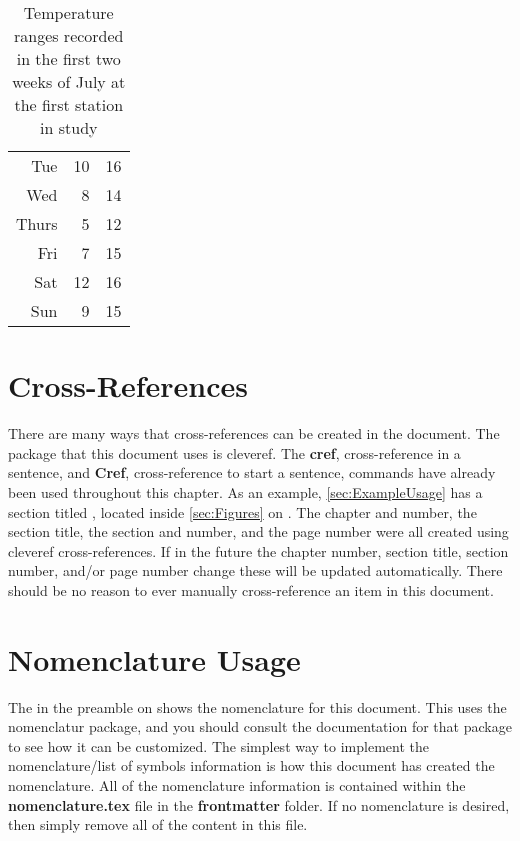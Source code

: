 \begin{table}
\begin{subtable}[h]{0.325\textwidth}
\begin{tabular}{r r r}
                Tue   & 10 & 16 \\
                Wed   & 8  & 14 \\
                Thurs & 5  & 12 \\
                Fri   & 7  & 15 \\
                Sat   & 12 & 16 \\
                Sun   & 9  & 15 \\
                \hline
            \end{tabular}
        \end{subtable}
        \caption{Temperature ranges recorded in the first two weeks of July at the first station in study}
        \label{tab:temps}
    \end{table}

\section{Cross-References} \label{sec:CrossReferences}
    There are many ways that cross-references can be created in the document.
    The package that this document uses is cleveref.
    The \textbf{cref}, cross-reference in a sentence, and \textbf{Cref}, cross-reference to start a sentence, commands have already been used throughout this chapter.
    As an example, \cref{sec:ExampleUsage} has a section titled \emph{}, located inside \cref{sec:Figures} on .
    The chapter and number, the section title, the section and number, and the page number were all created using cleveref cross-references.
    If in the future the chapter number, section title, section number, and/or page number change these will be updated automatically.
    There should be no reason to ever manually cross-reference an item in this document.

\section{Nomenclature Usage} \label{sec:NomenclatureUsage}
    The  in the preamble on  shows the nomenclature for this document.
    This uses the nomenclatur package, and you should consult the documentation for that package to see how it can be customized.
    The simplest way to implement the nomenclature/list of symbols information is how this document has created the nomenclature.
    All of the nomenclature information is contained within the \textbf{nomenclature.tex} file in the \textbf{frontmatter} folder.
    If no nomenclature is desired, then simply remove all of the content in this file.


